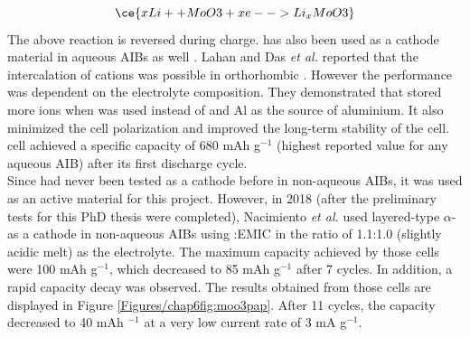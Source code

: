 \begin{equation} \label{moeq}
    \ce{xLi+ + MoO3 + xe- -> Li_{x}MoO3} 
\end{equation}
The above reaction is reversed during charge.  has also been used as a cathode material in aqueous AIBs as well \cite{joseph_hexagonal_2019, shakir_structural_2010, lahan_al3+_2019, lahan_active_2018}. Lahan and Das \textit{et al.} reported that the intercalation of  cations was possible in orthorhombic . However the performance was dependent on the electrolyte composition. They demonstrated that  stored more  ions when  was used instead of  and Al as the source of aluminium. It also minimized the cell polarization and improved the long-term stability of the cell.  cell achieved a specific capacity of 680 mAh g$^{-1}$ (highest reported value for any aqueous AIB) after its first discharge cycle. \\ 
Since  had never been tested as a cathode before in non-aqueous AIBs, it was used as an active material for this project. However, in 2018 (after the preliminary tests for this PhD thesis were completed), Nacimiento \textit{et al.} used layered-type $\alpha$- as a cathode in non-aqueous AIBs using :EMIC in the ratio of 1.1:1.0 (slightly acidic melt) as the electrolyte. The maximum capacity achieved by those cells were 100 mAh g$^{-1}$, which decreased to 85 mAh g$^{-1}$ after 7 cycles. In addition, a rapid capacity decay was observed. The results obtained from those cells are displayed in Figure \ref{Figures/chap6fig:moo3pap}. After 11 cycles, the capacity decreased to 40 mAh $^{-1}$ at a very low current rate of 3 mA g$^{-1}$. 

